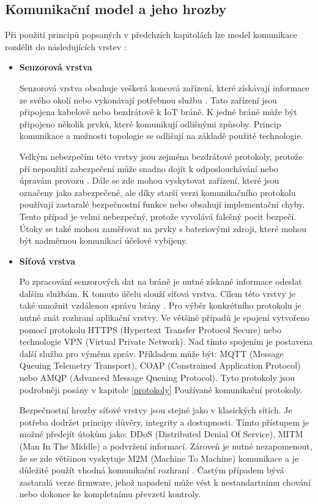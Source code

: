  \subsection{Komunikační model a jeho hrozby}
 Při použití principů popsaných v předchzích kapitolách lze model komunikace rozdělit
 do následujících vrstev \cite{iotSurvey}:
 \begin{itemize}

 \item \textbf{Senzorová vrstva}
 
 Senzorová vrstva obsahuje veškerá koncová zařízení, které získávají informace ze svého
 okolí nebo vykonávají potřebnou službu \cite{secFramework}. Tato zařízení jsou připojena
 kabelově nebo bezdrátově k IoT bráně. K jedné bráně může být připojeno několik
 prvků, které komunikují odlišnými způsoby. Princip komunikace a možnosti topologie se odlišují
 na základě použité technologie.
 
 Velkým nebezpečím této vrstvy jsou zejména bezdrátové protokoly, protože při nepoužití
 zabezpečení může snadno dojít k odposlouchávání nebo úpravám provozu \cite{iotSurvey}.
 Dále se zde mohou vyskytovat zařízení, které jsou označeny jako zabezpečené, 
 ale díky starší verzi komunikačního protokolu používají zastaralé bezpečnostní funkce
 nebo obsahují implementační chyby. 
 Tento případ je velmi nebezpečný, protože vyvolává falešný pocit bezpečí. Útoky se také mohou 
 zaměřovat na prvky s bateriovými zdroji, které mohou být nadměrnou komunikací
 účelově vybíjeny.
 
 \item \textbf{Síťová vrstva}
 
  Po zpracování senzorových dat na bráně je nutné získané informace odeslat dalším
 službám. K tomuto účelu slouží síťová vrstva. Cílem této vrstvy je také umožnit 
 vzdálenou správu brány \cite{secFramework}. Pro výběr konkrétního protokolu je 
 nutné znát rozhraní aplikační vrstvy. Ve většině případů je  spojení vytvořeno
 pomocí protokolu HTTPS (Hypertext Transfer Protocol Secure) nebo technologie
 VPN (Virtual Private Network). Nad tímto spojením je postavena další služba pro 
 výměnu zpráv. Příkladem může být: MQTT (Message Queuing Telemetry Transport),
 COAP (Constrained Application Protocol) nebo
 AMQP (Advanced Message Queuing Protocol). Tyto protokoly jsou podrobněji posány v 
 kapitole \ref{protokoly} Používané komunikační protokoly.
 
 Bezpečnostní hrozby síťové vrstvy jsou stejné jako v klasických sítích. Je potřeba
 dodržet principy důvěry, integrity a dostupnosti. Tímto přístupem je možné
 předejít útokům jako: DDoS (Distributed Denial Of Service),
 MITM (Man In The Middle) a podvržení informací. Zároveň je nutné
 nezapomenout, že se zde většinou vyskytuje M2M (Machine To Machine)
 komunikace a je důležité použít 
 vhodná komunikační rozhraní \cite{iotSurvey}. Častým případem bývá zastaralá 
 verze firmware, jehož napadení může vést k nestandartnímu chování nebo dokonce 
 ke kompletnímu převzetí kontroly. 
 

\end{itemize}
